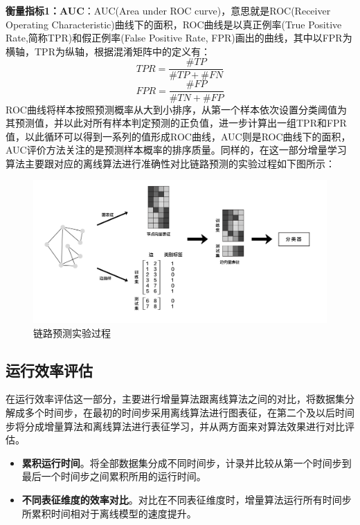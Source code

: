 \textbf{衡量指标1：AUC}：AUC(Area under ROC curve)，意思就是ROC(Receiver Operating Characteristic)曲线下的面积，ROC曲线是以真正例率(True Positive Rate,简称TPR)和假正例率(False Positive Rate, FPR)画出的曲线，其中以FPR为横轴，TPR为纵轴，根据混淆矩阵中的定义有：
\begin{equation}
	TPR = \frac{\#TP}{\#TP+\#FN}
\end{equation}
\begin{equation}
FPR = \frac{\#FP}{\#TN+\#FP}
\end{equation}
ROC曲线将样本按照预测概率从大到小排序，从第一个样本依次设置分类阈值为其预测值，并以此对所有样本判定预测的正负值，进一步计算出一组TPR和FPR值，以此循环可以得到一系列的值形成ROC曲线，AUC则是ROC曲线下的面积，AUC评价方法关注的是预测样本概率的排序质量。同样的，在这一部分增量学习算法主要跟对应的离线算法进行准确性对比链路预测的实验过程如下图所示：
\begin{figure}
	\centering
	\includegraphics[width=6in]{figures/link_predict_frame}
	\caption{链路预测实验过程}
\end{figure}

\subsection{运行效率评估}
在运行效率评估这一部分，主要进行增量算法跟离线算法之间的对比，将数据集分解成多个时间步，在最初的时间步采用离线算法进行图表征，在第二个及以后时间步将分成增量算法和离线算法进行表征学习，并从两方面来对算法效果进行对比评估。
\begin{itemize}
	\item \textbf{累积运行时间}。将全部数据集分成不同时间步，计录并比较从第一个时间步到最后一个时间步之间累积所用的运行时间。
	\item \textbf{不同表征维度的效率对比}。对比在不同表征维度时，增量算法运行所有时间步所累积时间相对于离线模型的速度提升。 
\end{itemize}

